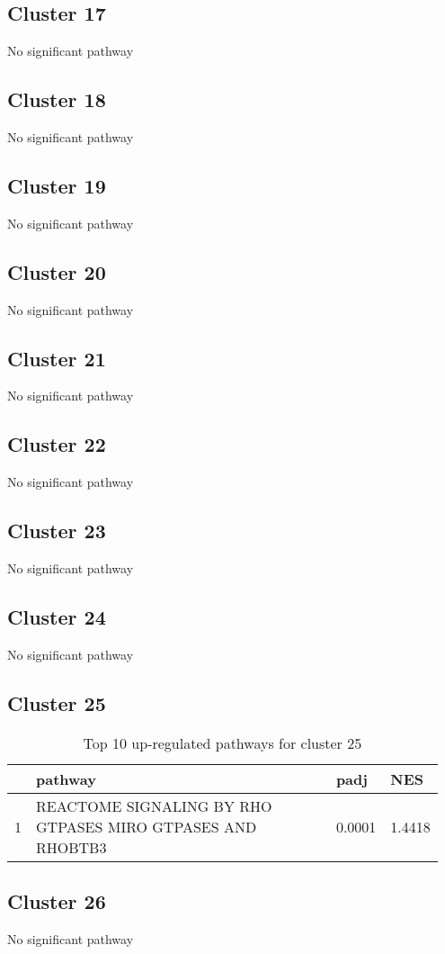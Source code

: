 \documentclass{article}
\begin{document}
\subsection{Cluster 17 }
No significant pathway
\subsection{Cluster 18 }
No significant pathway
\subsection{Cluster 19 }
No significant pathway
\subsection{Cluster 20 }
No significant pathway
\subsection{Cluster 21 }
No significant pathway
\subsection{Cluster 22 }
No significant pathway
\subsection{Cluster 23 }
No significant pathway
\subsection{Cluster 24 }
No significant pathway
\subsection{Cluster 25 }
\begin{table}[H]
\centering
\begin{tabular}{p{0.05\linewidth}p{0.7\linewidth}p{0.1\linewidth}p{0.1\linewidth}}
  \hline
 & pathway & padj & NES \\ 
  \hline
1 & REACTOME SIGNALING BY RHO GTPASES MIRO GTPASES AND RHOBTB3 & 0.0001 & 1.4418 \\ 
   \hline
\end{tabular}
\caption{Top 10 up-regulated pathways for cluster 25} 
\label{tab:q3_2_25}
\end{table}
\subsection{Cluster 26 }
No significant pathway
\end{document}
